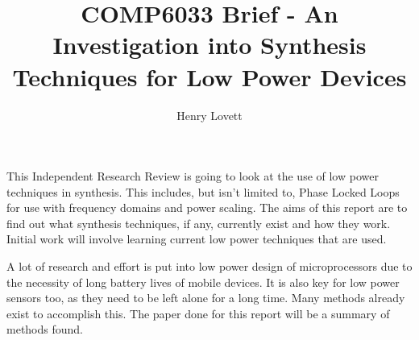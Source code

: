 \documentclass[12pt]{article}
\author{Henry Lovett}
\title{COMP6033 Brief - An Investigation into Synthesis Techniques for Low Power Devices}
\begin{document}
\maketitle



This Independent Research Review is going to look at the use of low power techniques in synthesis.
This includes, but isn't limited to, Phase Locked Loops for use with frequency domains and power scaling.
The aims of this report are to find out what synthesis techniques, if any, currently exist and how they work.
Initial work will involve learning current low power techniques that are used. 


A lot of research and effort is put into low power design of microprocessors due to the necessity of long battery lives of mobile devices.
It is also key for low power sensors too, as they need to be left alone for a long time. 
Many methods already exist to accomplish this. 
The paper done for this report will be a summary of methods found. 
\end{document}
